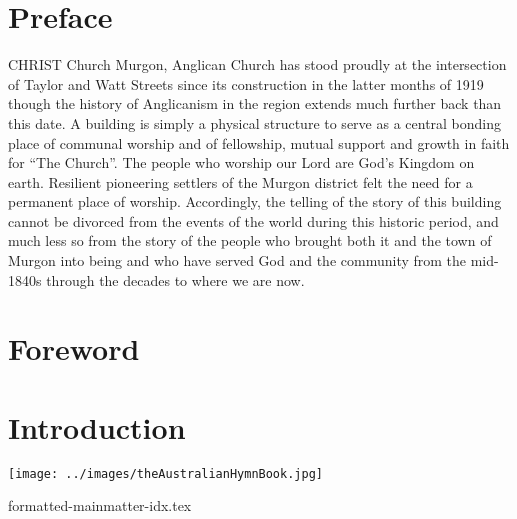 \documentclass[a4paper,11pt,parskip=never,DIV=8,chapterprefix=true,titlepage=true,twoside,twocolumn,open=any]{scrbook}
\begin{document}
\chapter{Preface}

\lettrine[lines=3]{C}{HRIST} Church Murgon, Anglican Church has stood proudly at the intersection of
Taylor and Watt Streets since its construction in the latter months of 1919 though
the history of Anglicanism in the region extends much further back than this date.
A building is simply a physical structure to serve as a central bonding place of
communal worship and of fellowship, mutual support and growth in faith for ``The Church''.
The people who worship our Lord are God's Kingdom on earth.
Resilient pioneering settlers of the Murgon district felt the need for a permanent place of
worship.  Accordingly, the telling of the story of this building cannot be divorced from
the events of the world during this historic period, and much less so from the story of
the people who brought both it and the town of Murgon into being and who have served
God and the community from the mid-1840s through the decades to where we are now.

\chapter{Foreword}
\blindtext

\twocolumn

\mainmatter
\setcounter{page}{1}

\chapter{Introduction}

\blindtext
\par

\begin{minipage}[b]{\linewidth}
\begin{center}
\texttt{[image: ../images/theAustralianHymnBook.jpg]}
\end{center}
\end{minipage}\par


{formatted-mainmatter-idx.tex}

\printindex
\end{document}
